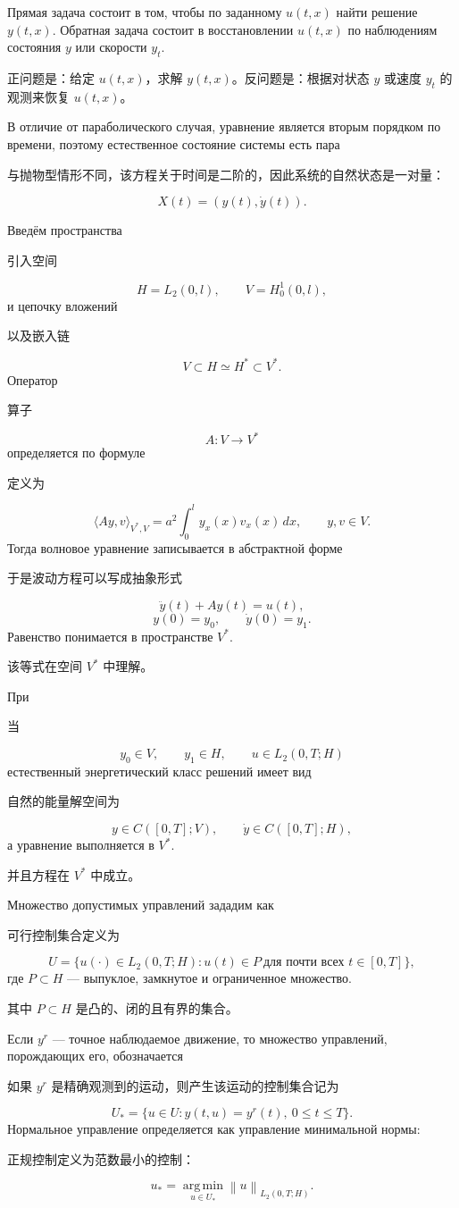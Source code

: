 \documentclass[12pt,a4paper]{article}
\newcommand{\dd}{\,d}
\newcommand{\norm}[1]{\left\lVert #1\right\rVert}
\newcommand{\zh}[1]{\par\noindent #1\par}
\begin{document}
Прямая задача состоит в том, чтобы по заданному $u(t,x)$ найти решение $y(t,x)$. Обратная задача состоит в восстановлении $u(t,x)$ по наблюдениям состояния $y$ или скорости $y_t$.
\zh{正问题是：给定 $u(t,x)$，求解 $y(t,x)$。反问题是：根据对状态 $y$ 或速度 $y_t$ 的观测来恢复 $u(t,x)$。}

В отличие от параболического случая, уравнение является вторым порядком по времени, поэтому естественное состояние системы есть пара
\zh{与抛物型情形不同，该方程关于时间是二阶的，因此系统的自然状态是一对量：}
\begin{equation}
    X(t)=(y(t),\dot y(t)).
\end{equation}

Введём пространства
\zh{引入空间}
\[
    H=L_2(0,l),\qquad V=H_0^1(0,l),
\]
и цепочку вложений
\zh{以及嵌入链}
\begin{equation}
    V\subset H\simeq H^*\subset V^*.
\end{equation}
Оператор
\zh{算子}
\[
    A:V\to V^*
\]
определяется по формуле
\zh{定义为}
\begin{equation}
    \langle Ay,v\rangle_{V^*,V}
    =a^2\int_0^l y_x(x)v_x(x)\dd x,
    \qquad y,v\in V.
\end{equation}
Тогда волновое уравнение записывается в абстрактной форме
\zh{于是波动方程可以写成抽象形式}
\begin{equation}
    \ddot y(t)+Ay(t)=u(t),
\end{equation}
\begin{equation}
    y(0)=y_0,
    \qquad \dot y(0)=y_1.
\end{equation}
Равенство понимается в пространстве $V^*$.
\zh{该等式在空间 $V^*$ 中理解。}

При
\zh{当}
\[
    y_0\in V,
    \qquad y_1\in H,
    \qquad u\in L_2(0,T;H)
\]
естественный энергетический класс решений имеет вид
\zh{自然的能量解空间为}
\begin{equation}
    y\in C([0,T];V),
    \qquad \dot y\in C([0,T];H),
\end{equation}
а уравнение выполняется в $V^*$.
\zh{并且方程在 $V^*$ 中成立。}

Множество допустимых управлений зададим как
\zh{可行控制集合定义为}
\begin{equation}
    U=\{u(\cdot)\in L_2(0,T;H): u(t)\in P\ \text{для почти всех }t\in[0,T]\},
\end{equation}
где $P\subset H$ --- выпуклое, замкнутое и ограниченное множество.
\zh{其中 $P\subset H$ 是凸的、闭的且有界的集合。}

Если $y^r$ --- точное наблюдаемое движение, то множество управлений, порождающих его, обозначается
\zh{如果 $y^r$ 是精确观测到的运动，则产生该运动的控制集合记为}
\begin{equation}
    U_* = \{u\in U:y(t,u)=y^r(t),\ 0\le t\le T\}.
\end{equation}
Нормальное управление определяется как управление минимальной нормы:
\zh{正规控制定义为范数最小的控制：}
\begin{equation}
    u_* = \operatorname*{arg\,min}_{u\in U_*}\norm{u}_{L_2(0,T;H)}.
\end{equation}
\end{document}
